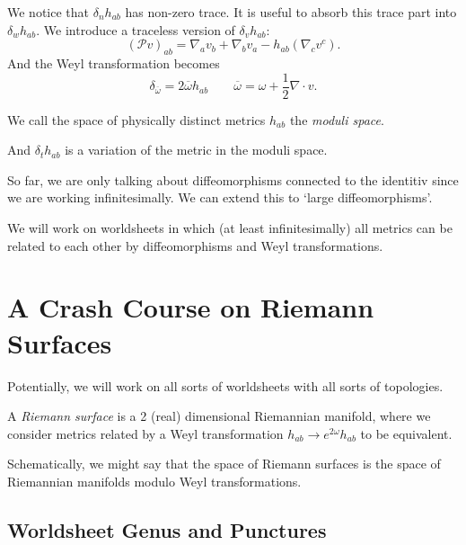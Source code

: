 We notice that $\delta_n h_{ab}$ has non-zero trace. It is useful to absorb this trace part into $\delta_w h_{ab}$.
We introduce a traceless version of $\delta_v h_{ab}$:
\begin{equation}
  \label{eq:Pv}
  \boxed{(\mathcal{P} v)_{ab} = \nabla_a v_b + \nabla_b v_a - h_{ab} (\nabla_c v^c)}.
\end{equation}
And the Weyl transformation becomes 
\begin{equation}
  \delta_{\overline{\omega}{}} = 2 \overline{\omega}{} h_{ab} \qquad \overline{\omega}{} = \omega + \frac{1}{2} \nabla \cdot v.
\end{equation}
\begin{definition}[]
  We call the space of physically distinct metrics $h_{ab}$ the \emph{moduli space}.
\end{definition}
And $\delta_t h_{ab}$ is a variation of the metric in the moduli space.

\begin{leftbar}
  So far, we are only talking about diffeomorphisms connected to the identitiv since we are working infinitesimally. We can extend this to `large diffeomorphisms'.
\end{leftbar}
We will work on worldsheets in which (at least infinitesimally) all metrics can be related to each other by diffeomorphisms and Weyl transformations.

\section{A Crash Course on Riemann Surfaces}%
\label{sec:a_crash_course_on_riemann_surfaces}

Potentially, we will work on all sorts of worldsheets with all sorts of topologies.
\begin{definition}
  A \emph{Riemann surface} is a 2 (real) dimensional Riemannian manifold, where we consider metrics related by a Weyl transformation $ h_{ab} \to e^{2 \omega} h_{ab} $ to be equivalent.
\end{definition}
Schematically, we might say that the space of Riemann surfaces is the space of Riemannian manifolds modulo Weyl transformations.

\subsection{Worldsheet Genus and Punctures}%
\label{sub:worldsheet_genus_and_punctures}

